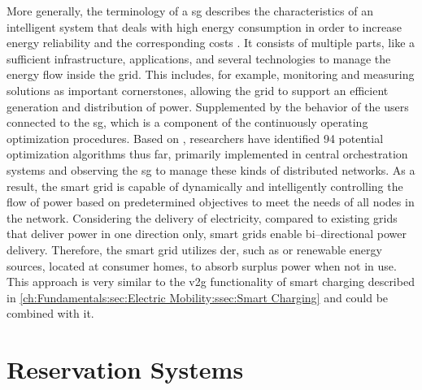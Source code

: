 More generally, the terminology of a \acrfull{sg} describes the characteristics of an intelligent system that deals with high energy consumption in order to increase energy reliability and the corresponding costs \cite{sharma_smart_2020,moreno_escobar_comprehensive_2021}.
It consists of multiple parts, like a sufficient infrastructure, applications, and several technologies to manage the energy flow inside the grid.
This includes, for example, monitoring and measuring solutions as important cornerstones, allowing the grid to support an efficient generation and distribution of power. Supplemented by the behavior of the users connected to the \acrshort{sg}, which is a component of the continuously operating optimization procedures.
Based on \cite{moreno_escobar_comprehensive_2021}, researchers have identified 94 potential optimization algorithms thus far, primarily implemented in central orchestration systems and observing the \acrshort{sg} to manage these kinds of distributed networks.
As a result, the smart grid is capable of dynamically and intelligently controlling the flow of power based on predetermined objectives to meet the needs of all nodes in the network. 
Considering the delivery of electricity, compared to existing grids that deliver power in one direction only, smart grids enable bi--directional power delivery.  
Therefore, the smart grid utilizes \acrshort{der}, such as  or renewable energy sources, located at consumer homes, to absorb surplus power when not in use.
This approach is very similar to the \acrshort{v2g} functionality of smart charging described in \ref{ch:Fundamentals:sec:Electric Mobility:ssec:Smart Charging} and could be combined with it.

\section{Reservation Systems}
\label{ch:Fundamentals:sec:Reservation Systems}

